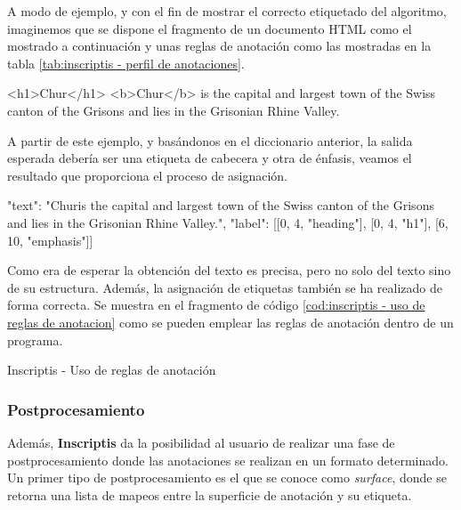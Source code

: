 A modo de ejemplo, y con el fin de mostrar el correcto etiquetado del algoritmo, imaginemos que se dispone 
el fragmento de un documento HTML como el mostrado a continuación y unas reglas de anotación como las 
mostradas en la tabla \ref{tab:inscriptis - perfil de anotaciones}.

\begin{Schunk}
  \begin{Soutput}
    <h1>Chur</h1>
    <b>Chur</b> is the capital and largest town of the Swiss 
    canton of the Grisons and lies in the Grisonian Rhine Valley.
  \end{Soutput}
\end{Schunk}

A partir de este ejemplo, y basándonos en el diccionario anterior, la salida esperada debería ser una 
etiqueta de cabecera y otra de énfasis, veamos el resultado que proporciona el proceso de asignación.

\begin{Schunk}
  \begin{Soutput}
    {
      "text": "Chur\n\nChur is the capital and largest town of the Swiss 
              canton of the Grisons and lies in the Grisonian Rhine Valley.",
      "label": [[0, 4, "heading"], [0, 4, "h1"], [6, 10, "emphasis"]]
    }
  \end{Soutput}
\end{Schunk}

Como era de esperar la obtención del texto es precisa, pero no solo del texto sino de su estructura. Además,
la asignación de etiquetas también se ha realizado de forma correcta. Se muestra en el fragmento de código
\ref{cod:inscriptis - uso de reglas de anotacion} como se pueden emplear las reglas de anotación dentro de 
un programa.

\begin{codefloat}
  
  \caption{Inscriptis - Uso de reglas de anotación}
  \label{cod:inscriptis - uso de reglas de anotacion}
\end{codefloat}

\subsubsection{Postprocesamiento}
\label{subsubsec:postprocesamiento}

Además, \textbf{Inscriptis} da la posibilidad al usuario de realizar una fase de postprocesamiento donde 
las anotaciones se realizan en un formato determinado. Un primer tipo de postprocesamiento es el que se 
conoce como \emph{surface}, donde se retorna una lista de mapeos entre la superficie de anotación y su 
etiqueta.

